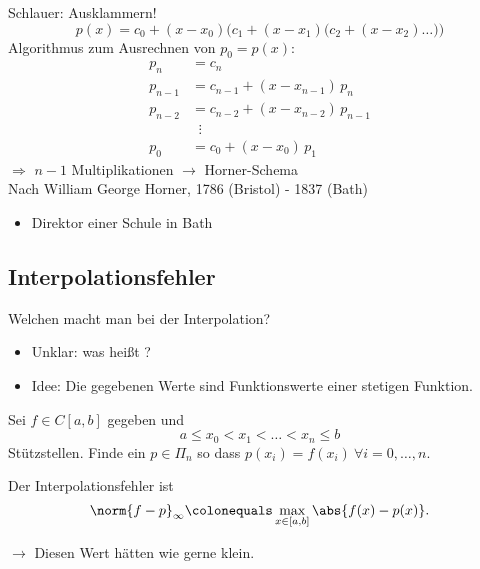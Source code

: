  \bigskip

 Schlauer: Ausklammern!
 \begin{equation*}
  p(x) = c_0 + (x-x_0) \Big( c_1 + (x-x_1)\big( c_2 + (x-x_2) \ldots \big)\Big)
 \end{equation*}
 Algorithmus zum Ausrechnen von $p_0=p(x)$:
 \begin{align*}
  p_n &= c_n \\
  p_{n-1} &= c_{n-1} + (x-x_{n-1})\, p_n \\
  p_{n-2} &= c_{n-2} + (x-x_{n-2})\, p_{n-1} \\
          & \;\; \vdots \\
  p_0 &= c_0 + (x-x_0)\, p_1
 \end{align*}
 $\Rightarrow$ $n-1$ Multiplikationen $\rightarrow$ Horner-Schema\\
 Nach William George Horner, 1786 (Bristol) - 1837 (Bath)
 \begin{itemize}
  \item Direktor einer Schule in Bath
 \end{itemize}


 
 \subsection{Interpolationsfehler}
 
 Welchen  macht man bei der Interpolation?
 \begin{itemize}
  \item Unklar: was heißt ?
  \item Idee: Die gegebenen Werte sind Funktionswerte einer stetigen Funktion.
 \end{itemize}
 
 \begin{definition}[Interpolationsproblem II]
  Sei $f\in C[a,b]$ gegeben und
  \begin{equation*}
   a \leq x_0 < x_1 < \hdots < x_n \leq b
  \end{equation*}
  Stützstellen. Finde ein $p\in\Pi_n$ so dass $p(x_i)=f(x_i)\ \forall i=0,\hdots,n$.
 \end{definition}
 \begin{definition}
  Der Interpolationsfehler ist
  \begin{equation*}
   \norm{f-p}_\infty \colonequals \max_{x\in[a,b]} \abs{ f(x) - p(x)}.
  \end{equation*}
   \end{definition}
$\rightarrow$ Diesen Wert hätten wie gerne klein.

